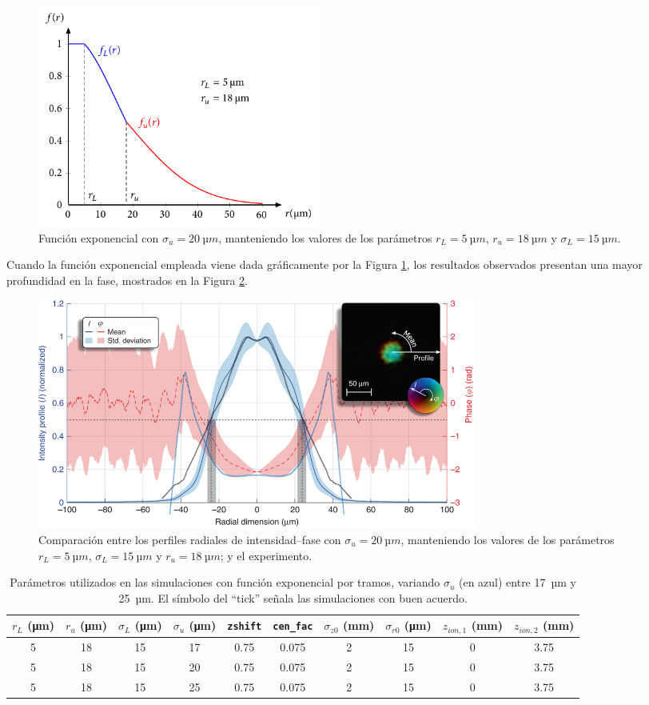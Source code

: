 \begin{figure}[htbp]
  \centering
  \includegraphics[width=0.45\textwidth]{Figuras/ch4_fexp2.pdf}
  \caption{Función exponencial con $\sigma_{u}=\qty{20}{µm}$, manteniendo los valores de los parámetros $r_{L}=\qty{5}{µm}$, $r_{u}=\qty{18}{µm}$ y $\sigma_{L}=\qty{15}{µm}$.}
  \label{fig:4.32}
\end{figure}

Cuando la función exponencial empleada viene dada gráficamente por la Figura \ref{fig:4.32}, los resultados observados presentan una mayor profundidad en la fase, mostrados en la Figura \ref{fig:4.33}.

\begin{figure}[htbp]
  \centering
  \includegraphics[width=0.7\textwidth]{Figuras/ch4_cmp81.png}
  \caption{Comparación entre los perfiles radiales de intensidad--fase con $\sigma_{u}=\qty{20}{µm}$, manteniendo los valores de los parámetros $r_{L}=\qty{5}{µm}$, $\sigma_{L}=\qty{15}{µm}$ y $r_{u}=\qty{18}{µm}$; y el experimento.}
  \label{fig:4.33}
\end{figure}

\begin{table}[htpb]
  \centering
  \scriptsize
  \caption{Parámetros utilizados en las simulaciones con función exponencial por tramos, variando $\sigma_{u}$ (en azul) entre \qty{17}{µm} y \qty{25}{µm}. El símbolo del \enquote{tick} señala las simulaciones con buen acuerdo.}
  \label{tab:4.10}
  \begin{tabular}{SSS>{\color{miazul}}SSSSSSS}
  \toprule
  {$r_{L}$ (\unit{\um})} & {$r_{u}$ (\unit{\um})} & {$\sigma_{L}$ (\unit{\um})} & {$\sigma_{u}$ (\unit{\um})} & {\texttt{zshift}} & {\texttt{cen\_fac}} & {$\sigma_{z0}$ (\unit{mm})} & {$\sigma_{r0}$ (\unit{\um})} & {$z_{ion,1}$ (\unit{mm})} & {$z_{ion,2}$ (\unit{mm})} \\ 
    & 18  & 15 & 17  & 0.75  & 0.075  & 2  & 15  & 0  & 3.75  \\
  5  & 18  & 15 & 20  & 0.75  & 0.075  & 2  & 15  & 0  & 3.75  \\
  5  & 18  & 15 & 25  & 0.75  & 0.075  & 2  & 15  & 0  & 3.75  \\
  \bottomrule
  \end{tabular}
\end{table}

